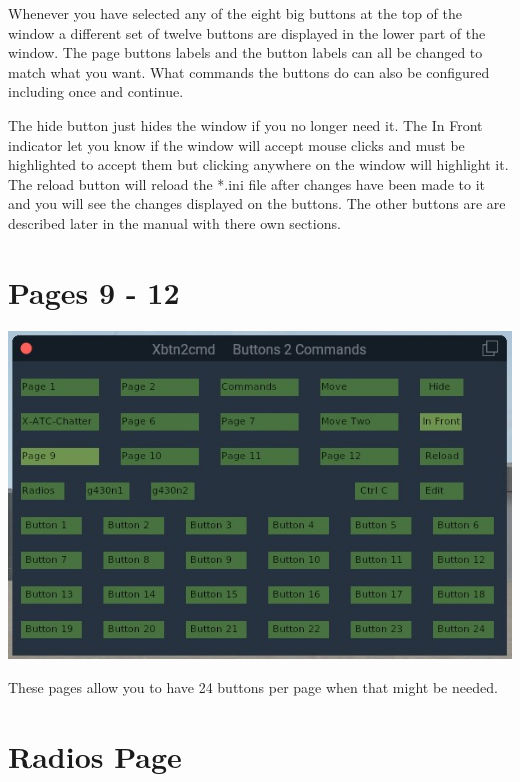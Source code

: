 \documentclass[11pt,parskip=half,a4paper]{scrartcl}
\begin{document}
Whenever you have selected any of the eight big buttons at the top of the window a different set of twelve buttons are displayed in the lower part of the window. The page buttons labels and the button labels can all be changed to match what you want. What commands the buttons do can also be configured including once and continue. \newline

The hide button just hides the window if you no longer need it. The In Front indicator let you know if the window will accept mouse clicks and must be highlighted to accept them but clicking anywhere on the window will highlight it. The reload button will reload the *.ini file after changes have been made to it and you will see the changes displayed on the buttons. The other buttons are are described later in the manual with there own sections.

\newpage
\section{Pages 9 - 12}

\begin{center}
\includegraphics[width=15cm]{../pics/Xbtn2cmd_Page9.jpg}
\end{center}

These pages allow you to have 24 buttons per page when that might be needed.


\newpage
\section{Radios Page}
\end{document}
